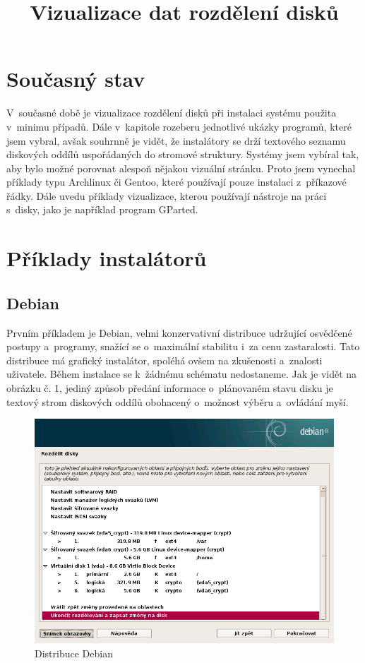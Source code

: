 \documentclass[a4paper,twosided]{article}
\begin{document}
\title{Vizualizace dat rozdělení disků}
\date{}
\maketitle
\section{Současný stav}

V~současné době je vizualizace rozdělení disků při instalaci systému použita v~minimu případů. Dále v~kapitole rozeberu jednotlivé ukázky programů, které jsem vybral, avšak souhrnně je vidět, 
že instalátory se drží textového seznamu diskových oddílů uspořádaných do stromové struktury. Systémy jsem vybíral tak, aby bylo možné porovnat alespoň nějakou vizuální stránku. Proto jsem vynechal
příklady typu Archlinux či Gentoo, které používají pouze instalaci z~příkazové řádky.  Dále uvedu příklady vizualizace, kterou používají nástroje na práci s~disky, jako je 
například program GParted.

\section{Příklady instalátorů}

\subsection{Debian}

Prvním příkladem je Debian, velmi konzervativní distribuce udržující osvědčené postupy a~programy, snažící se o~maximální stabilitu i~za cenu zastaralosti. 
Tato distribuce má grafický instalátor, spoléhá ovšem na zkušenosti a~znalosti uživatele. Během instalace se k~žádnému schématu nedostaneme. Jak je vidět na obrázku č. 1, jediný způsob předání 
informace o~plánovaném stavu disku je textový strom diskových oddílů obohacený o~možnost výběru a~ovládání myší.

\begin{figure}[b]
\caption{Distribuce Debian}
\centering
\includegraphics[width=.8\columnwidth]{pics/debian1.png}
\end{figure}
\end{document}
